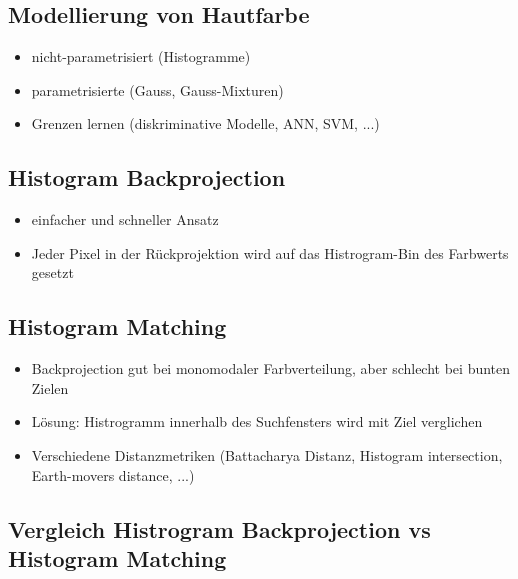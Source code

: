 \documentclass[paper=a4, fontsize=11pt]{scrartcl} %
\numberwithin{equation}{section} %
\numberwithin{figure}{section} %
\numberwithin{table}{section} %
\begin{document}
\subsection{Modellierung von Hautfarbe}

\begin{itemize}
\item nicht-parametrisiert (Histogramme)
\item parametrisierte (Gauss, Gauss-Mixturen)
\item Grenzen lernen (diskriminative Modelle, ANN, SVM, ...)
\end{itemize}

\subsection{Histogram Backprojection}

\begin{itemize}
\item einfacher und schneller Ansatz
\item Jeder Pixel in der Rückprojektion wird auf das Histrogram-Bin des Farbwerts gesetzt
\end{itemize}

\subsection{Histogram Matching}

\begin{itemize}
\item Backprojection gut bei monomodaler Farbverteilung, aber schlecht bei bunten Zielen
\item Lösung: Histrogramm innerhalb des Suchfensters wird mit Ziel verglichen
\item Verschiedene Distanzmetriken (Battacharya Distanz, Histogram intersection, Earth-movers distance, ...)
\end{itemize}

\subsection{Vergleich Histrogram Backprojection vs Histogram Matching}
\end{document}
